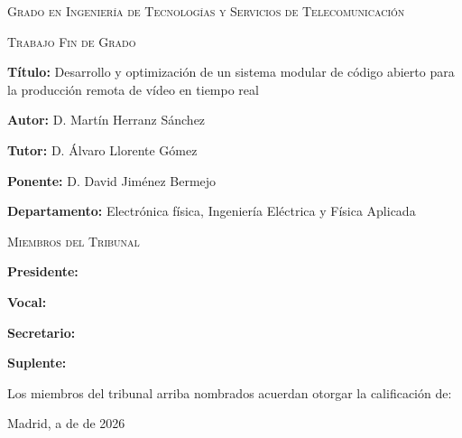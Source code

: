 \begin{titlepage}
\Large{\textsc{\textcolor{nar}{Grado en Ingeniería de Tecnologías y Servicios de Telecomunicación}}} \par
\vspace{0.3cm}
\colorbox{nar}{\Large{\textsc{Trabajo Fin de Grado}}} \par
\vspace{0.2cm}
\normalsize{\textbf{Título:} Desarrollo y optimización de un sistema modular de código abierto para la producción remota de vídeo en tiempo real} \par
\vspace{0.2cm}
\normalsize{\textbf{Autor:} D. Martín Herranz Sánchez} \par
\vspace{0.2cm}
\normalsize{\textbf{Tutor:} D. Álvaro Llorente Gómez} \par
\vspace{0.2cm}
\normalsize{\textbf{Ponente:} D. David Jiménez Bermejo} \par
\vspace{0.2cm}
\normalsize{\textbf{Departamento:} Electrónica física, Ingeniería Eléctrica y Física Aplicada} \par
\vspace{1cm}
\colorbox{nar}{\Large{\textsc{Miembros del Tribunal}}} \par
\vspace{0.2cm}
\normalsize{\textbf{Presidente:}} \par
\vspace{0.2cm}
\normalsize{\textbf{Vocal:}} \par
\vspace{0.2cm}
\normalsize{\textbf{Secretario:}} \par
\vspace{0.2cm}
\normalsize{\textbf{Suplente:}} \par
\vspace{0.8cm}
\normalsize{Los miembros del tribunal arriba nombrados acuerdan otorgar la calificación de:} \par
\vspace{2cm}
\flushright
\normalsize{Madrid, a \quad \quad\quad de \quad \quad\quad\quad\quad\quad\quad de 2026} \par
\end{titlepage}
